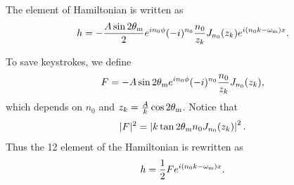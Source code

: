 The element of Hamiltonian is written as
\begin{equation}
   h = - \frac{A\sin 2\theta_\mathrm m}{2} e^{in_0\phi} (-i)^{n_0} \frac{n_0}{z_k} J_{n_0 }(z_k) e^{i(n_0 k -\omega_\mathrm m)x}.
\end{equation}

To save keystrokes, we define
\begin{equation}
   F = - A\sin 2\theta_\mm e^{i n_0 \phi} (-i)^{n_0} \frac{n_0}{z_k} J_{n_0} (z_k) ,
   \label{chap:matter-sec:deep-jacobi-subsec:single-matter-freq-eqn:definition-F}
\end{equation}
which depends on $n_0$ and $z_k = \frac{A}{k} \cos 2\theta_\mathrm m$. Notice that
\begin{equation}
   \lvert F \rvert^2 = \left\lvert  k \tan 2\theta_\mathrm m  n_0 J_{n_0} (z_k) \right\rvert^2 .
\end{equation}
Thus the 12 element of the Hamiltonian is rewritten as
\begin{equation}
   h = \frac{1}{2}F e^{i(n_0 k -\omega_\mm)x}.
   \label{chap:matter-sec:deep-jacobi-subsec:single-matter-freq-eqn:eqn-12-element-and-F}
\end{equation}






